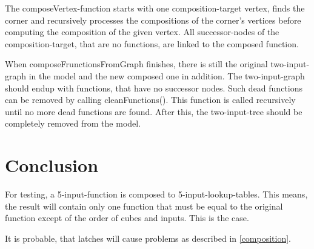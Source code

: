 \documentclass[colorback,accentcolor=tud1c,11pt]{tudreport}
\begin{document}
The composeVertex-function starts with one composition-target vertex, finds the corner and recursively processes the compositions of the corner's vertices before computing the composition of the given vertex. All successor-nodes of the composition-target, that are no functions, are linked to the composed function.

When composeFrunctionsFromGraph finishes, there is still the original two-input-graph in the model and the new composed one in addition. The two-input-graph should endup with functions, that have no successor nodes. Such dead functions can be removed by calling cleanFunctions(). This function is called recursively until no more dead functions are found. After this, the two-input-tree should be completely removed from the model.



\chapter{Conclusion}
For testing, a 5-input-function is composed to 5-input-lookup-tables. This means, the result will contain only one function that must be equal to the original function except of the order of cubes and inputs. This is the case.

It is probable, that latches will cause problems as described in \ref{composition}.





\end{document}
